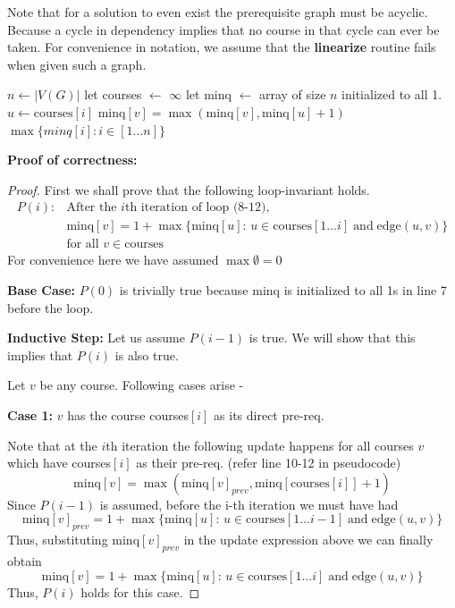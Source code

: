 \documentclass[answers]{exam}
\begin{document}
\begin{questions}
\begin{solution}
Note that for a solution to even exist the prerequisite graph must be acyclic. Because a cycle in dependency implies that no course in that cycle can ever be taken. For convenience in notation, we assume that the \textbf{linearize} routine fails when given such a graph.

\begin{algorithmic}[1]
    \State $n \gets |V(G)|$
    \State let courses $\gets$  
     
        \State \Return $\infty$  
    \EndIf
    \State let minq $\gets$ array of size $n$ initialized to all 1.
        \State $u \gets \text{courses}[i]$
            \State minq$[v] = \max (\text{minq}[v], \text{minq}[u]+1)$
        \EndFor
    \EndFor
    \State \Return $\max \{minq[i]: i \in [1\ldots n]\}$ 
\EndFunction
\end{algorithmic}

\textbf{Proof of correctness:}
\begin{proof}
First we shall prove that the following loop-invariant holds.
\begin{align*}
    P(i): & \text{After the $i$th iteration of loop (8-12)},\\
         & \text{minq}[v] = 1 + \max \{\text{minq}[u]:\, u \in \text{courses}[1\ldots i] \;\text{and}\; \text{edge}(u, v)\} \\
         & \text{for all } v \in \text{courses}
\end{align*}
For convenience here we have assumed $\max \emptyset = 0$

\textbf{Base Case: } $P(0)$ is trivially true because minq is initialized to all 1s in line 7 before the loop.

\textbf{Inductive Step: } Let us assume $P(i-1)$ is true. We will show that this implies that $P(i)$ is also true.

Let $v$ be any course. Following cases arise -

\textbf{Case 1: } $v$ has the course courses$[i]$ as its direct pre-req.

Note that at the $i$th iteration the following update happens for all courses $v$ which have courses$[i]$ as their pre-req. (refer line 10-12 in pseudocode)
\[
    \text{minq}[v] = \max (\text{minq}[v]_{prev}, \text{minq}[\text{courses}[i]] + 1)
\]
Since $P(i-1)$ is assumed, before the i-th iteration we must have had
\[
    \text{minq}[v]_{prev} = 1 + \max \{\text{minq}[u]:\, u \in \text{courses}[1\ldots i-1] \;\text{and}\; \text{edge}(u, v)\} 
\]
Thus, substituting $\text{minq}[v]_{prev}$ in the update expression above we can finally obtain
\[
    \text{minq}[v] = 1 + \max \{\text{minq}[u]:\, u \in \text{courses}[1\ldots i] \;\text{and}\; \text{edge}(u, v)\} 
\]
Thus, $P(i)$ holds for this case.


\end{proof}
\end{solution}
\end{questions}
\end{document}
